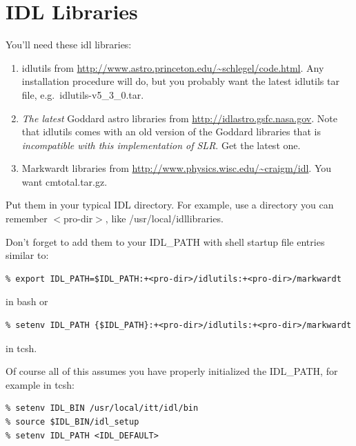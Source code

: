 \documentclass{report}
\newcommand{\slr}{SLR}
\begin{document}
\section{IDL Libraries}

You'll need these idl libraries:

\begin{enumerate}
\item idlutils from
  \url{http://www.astro.princeton.edu/~schlegel/code.html}.  Any
  installation procedure will do, but you probably want the latest
  idlutils tar file, e.g.\ idlutils-v5\_3\_0.tar.
\item {\it The latest} Goddard astro libraries from
  \url{http://idlastro.gsfc.nasa.gov}.  Note that idlutils comes with
  an old version of the Goddard libraries that is {\it incompatible
    with this implementation of SLR}.  Get the latest one.
\item Markwardt libraries from
  \url{http://www.physics.wisc.edu/~craigm/idl}.  You want
  cmtotal.tar.gz.
\end{enumerate}

Put them in your typical IDL directory. For example, use a directory
you can remember $<$pro-dir$>$, like /usr/local/idllibraries.

Don't forget to add them to your IDL\_PATH with shell startup file
entries similar to:
\begin{verbatim}
% export IDL_PATH=$IDL_PATH:+<pro-dir>/idlutils:+<pro-dir>/markwardt
\end{verbatim}
in bash or
\begin{verbatim}
% setenv IDL_PATH {$IDL_PATH}:+<pro-dir>/idlutils:+<pro-dir>/markwardt
\end{verbatim}
in tcsh.

Of course all of this assumes you have properly initialized the
IDL\_PATH, for example in tcsh:
\begin{verbatim}
% setenv IDL_BIN /usr/local/itt/idl/bin
% source $IDL_BIN/idl_setup
% setenv IDL_PATH <IDL_DEFAULT>
\end{verbatim}


\end{document}
